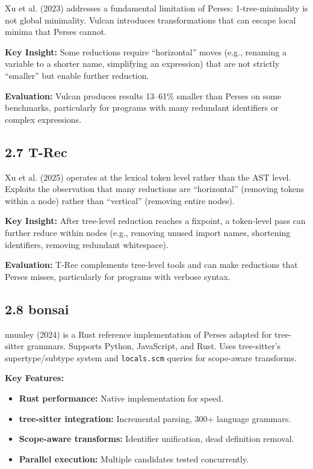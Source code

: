 \documentclass[
  letterpaper,
]{article}
\providecommand{\tightlist}{%
  \setlength{\itemsep}{0pt}\setlength{\parskip}{0pt}}
\begin{document}
Xu et al. (2023) addresses a fundamental limitation of Perses:
1-tree-minimality is not global minimality. Vulcan introduces
transformations that can escape local minima that Perses cannot.

\textbf{Key Insight:} Some reductions require ``horizontal'' moves
(e.g., renaming a variable to a shorter name, simplifying an expression)
that are not strictly ``smaller'' but enable further reduction.

\textbf{Evaluation:} Vulcan produces results 13--61\% smaller than
Perses on some benchmarks, particularly for programs with many redundant
identifiers or complex expressions.

\subsection{2.7 T-Rec}\label{t-rec}

Xu et al. (2025) operates at the lexical token level rather than the AST
level. Exploits the observation that many reductions are ``horizontal''
(removing tokens within a node) rather than ``vertical'' (removing
entire nodes).

\textbf{Key Insight:} After tree-level reduction reaches a fixpoint, a
token-level pass can further reduce within nodes (e.g., removing unused
import names, shortening identifiers, removing redundant whitespace).

\textbf{Evaluation:} T-Rec complements tree-level tools and can make
reductions that Perses misses, particularly for programs with verbose
syntax.

\subsection{2.8 bonsai}\label{bonsai}

{nnunley} (2024) is a Rust reference implementation of Perses adapted
for tree-sitter grammars. Supports Python, JavaScript, and Rust. Uses
tree-sitter's supertype/subtype system and \texttt{locals.scm} queries
for scope-aware transforms.

\textbf{Key Features:}

\begin{itemize}
\tightlist
\item
  \textbf{Rust performance:} Native implementation for speed.
\item
  \textbf{tree-sitter integration:} Incremental parsing, 300+ language
  grammars.
\item
  \textbf{Scope-aware transforms:} Identifier unification, dead
  definition removal.
\item
  \textbf{Parallel execution:} Multiple candidates tested concurrently.
\end{itemize}
\end{document}
